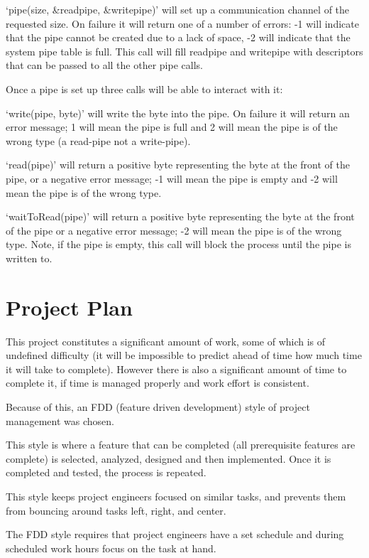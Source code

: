 \documentclass[a4paper]{report}
\begin{document}
`pipe(size, \&readpipe, \&writepipe)' will set up a communication channel of the requested size. On failure it will return one of a number of errors: -1 will indicate that the pipe cannot be created due to a lack of space, -2 will indicate that the system pipe table is full. This call will fill readpipe and writepipe with descriptors that can be passed to all the other pipe calls.

Once a pipe is set up three calls will be able to interact with it:

`write(pipe, byte)' will write the byte into the pipe. On failure it will return an error message; 1 will mean the pipe is full and 2 will mean the pipe is of the wrong type (a read-pipe not a write-pipe).

`read(pipe)' will return a positive byte representing the byte at the front of the pipe, or a negative error message; -1 will mean the pipe is empty and -2 will mean the pipe is of the wrong type.

`waitToRead(pipe)' will return a positive byte representing the byte at the front of the pipe or a negative error message; -2 will mean the pipe is of the wrong type. Note, if the pipe is empty, this call will block the process until the pipe is written to.

\chapter*{Project Plan}

This project constitutes a significant amount of work, some of which is of undefined difficulty (it will be impossible to predict ahead of time how much time it will take to complete). However there is also a significant amount of time to complete it, if time is managed properly and work effort is consistent.

Because of this, an FDD (feature driven development) style of project management was chosen.

This style is where a feature that can be completed (all prerequisite features are complete) is selected, analyzed, designed and then implemented. Once it is completed and tested, the process is repeated.

This style keeps project engineers focused on similar tasks, and prevents them from bouncing around tasks left, right, and center.

The FDD style requires that project engineers have a set schedule and during scheduled work hours focus on the task at hand.
\end{document}
